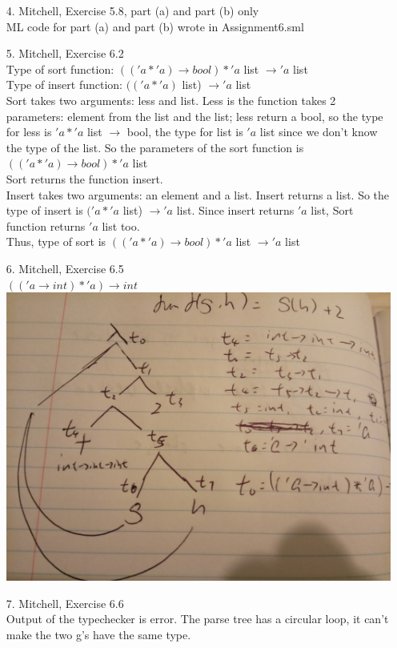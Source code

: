 \documentclass[12pt]{article}
\begin{document}
\begin{enumerate}
\item[4.] Mitchell, Exercise 5.8, part (a) and part (b) only\\
ML code for part (a) and part (b) wrote in Assignment6.sml
\item[5.] Mitchell, Exercise 6.2\\
Type of sort function: $(('a *'a) \to bool) * 'a$ list $\to 'a$ list\\
Type of insert function: $(('a * 'a)$ list) $\to 'a$ list\\
Sort takes two arguments: less and list. Less is the function takes 2 parameters: element from the list and the list; less return a bool, so the type for less is $'a * 'a$ list $\to$ bool, the type for list is $'a$ list since we don't know the type of the list. So the parameters of the sort function is $(('a *'a) \to bool) * 'a$ list \\
Sort returns the function insert. \\
Insert takes two arguments: an element and a list. Insert returns a list. So the type of insert is $('a * 'a$ list) $\to 'a$ list. Since insert returns $'a$ list, Sort function returns $'a$ list too.\\
Thus, type of sort is $(('a *'a) \to bool) * 'a$ list $\to 'a$ list
\item[6.] Mitchell, Exercise 6.5\\
$(('a \to int)* 'a) \to int$\\
\includegraphics[width=\textwidth]{6.jpg}
\item[7.] Mitchell, Exercise 6.6\\
Output of the typechecker is error. The parse tree has a circular loop, it can't make the two g's have the same type.

\end{enumerate}
\end{document}
